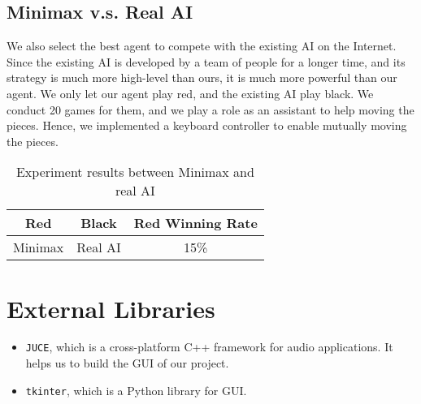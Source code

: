\documentclass[letterpaper]{article}
\begin{document}
\subsection{Minimax v.s. Real AI}
\label{subsec:minimax-v.s.-real-ai}
We also select the best agent to compete with the existing AI on the Internet.
Since the existing AI is developed by a team of people for a longer time, and its strategy is much more high-level than ours, it is much more powerful than our agent.
We only let our agent play red, and the existing AI play black.
We conduct 20 games for them, and we play a role as an assistant to help moving the pieces.
Hence, we implemented a keyboard controller to enable mutually moving the pieces.
\begin{table}[htbp]
    \centering
    \caption{Experiment results between Minimax and real AI}
    \label{tab:tab3}
    \begin{tabular}{|c|c|c|}
        \hline
        Red & Black & Red Winning Rate  \\ \hline
        Minimax & Real AI & 15\% \\ \hline
    \end{tabular}
\end{table}


\section{External Libraries}\label{sec:acknowledgements}

\begin{itemize}
    \item \texttt{JUCE}, which is a cross-platform C++ framework for audio applications.
    It helps us to build the GUI of our project.
    \item \texttt{tkinter}, which is a Python library for GUI\@.
\end{itemize}



\end{document}
